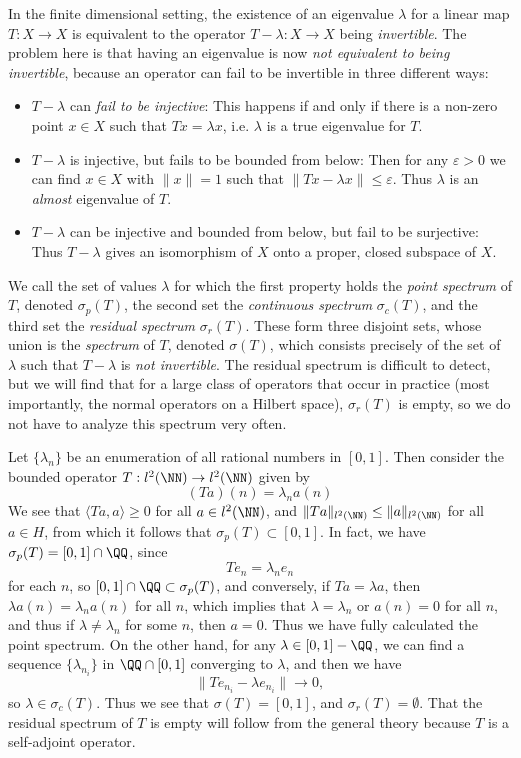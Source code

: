 In the finite dimensional setting, the existence of an eigenvalue $\lambda$ for a linear map $T: X \to X$ is equivalent to the operator $T - \lambda: X \to X$ being \emph{invertible}. The problem here is that having an eigenvalue is now \emph{not equivalent to being invertible}, because an operator can fail to be invertible in three different ways:
%
\begin{itemize}
    \item $T - \lambda$ can \emph{fail to be injective}: This happens if and only if there is a non-zero point $x \in X$ such that $Tx = \lambda x$, i.e. $\lambda$ is a true eigenvalue for $T$.
    \item $T - \lambda$ is injective, but fails to be bounded from below: Then for any $\varepsilon > 0$ we can find $x \in X$ with $\| x \| = 1$ such that $\| Tx - \lambda x \| \leq \varepsilon$. Thus $\lambda$ is an \emph{almost} eigenvalue of $T$.
    \item $T - \lambda$ can be injective and bounded from below, but fail to be surjective: Thus $T - \lambda$ gives an isomorphism of $X$ onto a proper, closed subspace of $X$.
\end{itemize}
%
We call the set of values $\lambda$ for which the first property holds the \emph{point spectrum} of $T$, denoted $\sigma_p(T)$, the second set the \emph{continuous spectrum} $\sigma_c(T)$, and the third set the \emph{residual spectrum} $\sigma_r(T)$. These form three disjoint sets, whose union is the \emph{spectrum} of $T$, denoted $\sigma(T)$, which consists precisely of the set of $\lambda$ such that $T - \lambda$ is \emph{not invertible}. The residual spectrum is difficult to detect, but we will find that for a large class of operators that occur in practice (most importantly, the normal operators on a Hilbert space), $\sigma_r(T)$ is empty, so we do not have to analyze this spectrum very often.

\begin{example}
    Let $\{ \lambda_n \}$ be an enumeration of all rational numbers in $[0,1]$. Then consider the bounded operator $T: l^2(\NN) \to l^2(\NN)$ given by
    \[ (Ta)(n) = \lambda_n a(n) \]
    We see that $\langle Ta, a \rangle \geq 0$ for all $a \in l^2(\NN)$, and $\| Ta \|_{l^2(\NN)} \leq \| a \|_{l^2(\NN)}$ for all $a \in H$, from which it follows that $\sigma_p(T) \subset [0,1]$. In fact, we have $\sigma_p(T) = [0,1] \cap \QQ$, since
    \[ Te_n = \lambda_n e_n \]
    for each $n$, so $[0,1] \cap \QQ \subset \sigma_p(T)$, and conversely, if $Ta = \lambda a$, then $\lambda a(n) = \lambda_n a(n)$ for all $n$, which implies that $\lambda = \lambda_n$ or $a(n) = 0$ for all $n$, and thus if $\lambda \neq \lambda_n$ for some $n$, then $a = 0$. Thus we have fully calculated the point spectrum. On the other hand, for any $\lambda \in [0,1] - \QQ$, we can find a sequence $\{ \lambda_{n_i} \}$ in $\QQ \cap [0,1]$ converging to $\lambda$, and then we have
    \[ \| T e_{n_i} - \lambda e_{n_i} \| \to 0, \]
    so $\lambda \in \sigma_c(T)$. Thus we see that $\sigma(T) = [0,1]$, and $\sigma_r(T) = \emptyset$. That the residual spectrum of $T$ is empty will follow from the general theory because $T$ is a self-adjoint operator.
\end{example}

